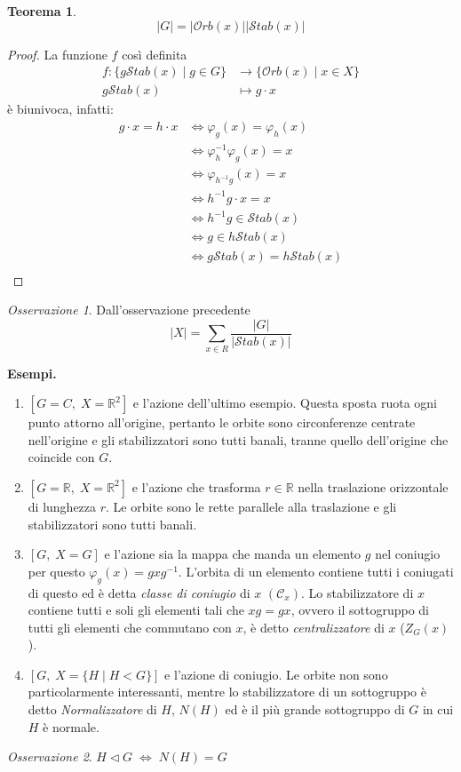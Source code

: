 \documentclass[a4paper]{article}
\newtheorem{theorem}{Teorema}[section]
\theoremstyle{remark}
\newtheorem*{remark}{Osservazione}
\theoremstyle{definition}
\newcommand{\Orb}[1]{\mathcal{O}rb\left( #1 \right)}
\newcommand{\Stab}[1]{\mathcal{S}tab\left( #1 \right)}
\begin{document}
\begin{multicols}{2}
\begin{theorem}
	\[ |G| = |\Orb{x}||\Stab{x}| \]
\end{theorem}
\begin{proof}
	La funzione $ f $ così definita
	\begin{align*}
	f \colon \{ g \Stab{x} \mid g \in G \} &\to \{\Orb{x} \mid x \in X\} \\
	g\Stab{x} &\mapsto g \cdot x
	\end{align*}
	è biunivoca, infatti:
	\begin{align*}
		g \cdot x = h \cdot x & \Leftrightarrow \varphi_g(x) = \varphi_h(x) \\
		& \Leftrightarrow \varphi_h^{-1} \varphi_g (x) = x \\
		& \Leftrightarrow \varphi_{h^{-1}g} (x) = x \\
		& \Leftrightarrow h^{-1}g \cdot x = x \\
		& \Leftrightarrow h^{-1}g \in \Stab{x} \\
		& \Leftrightarrow g \in h\Stab{x} \\
		& \Leftrightarrow g\Stab{x} = h\Stab{x} \\
	\end{align*}
\end{proof}
\begin{remark}
	Dall'osservazione precedente \[ |X| = \sum_{x \in R} \frac{|G|}{|\Stab{x}|} \]
\end{remark}

\textbf{Esempi.}
\begin{enumerate}
	\item $ [G = C,\; X = \mathbb{R}^2 ] $ e l'azione dell'ultimo esempio. Questa sposta ruota ogni punto attorno all'origine, pertanto le orbite sono circonferenze centrate nell'origine e gli stabilizzatori sono tutti banali, tranne quello dell'origine che coincide con $ G $.
	\item $ [G = \mathbb{R},\; X = \mathbb{R}^2 ] $ e l'azione che trasforma $ r \in \mathbb{R} $ nella traslazione orizzontale di lunghezza $ r $. Le orbite sono le rette parallele alla traslazione e gli stabilizzatori sono tutti banali.
	\item $ [G,\; X = G ] $ e l'azione sia la mappa che manda un elemento $ g $ nel coniugio per questo $ \varphi_g(x) = gxg^{-1} $. L'orbita di un elemento contiene tutti i coniugati di questo ed è detta \emph{classe di coniugio} di $ x $ $ (\mathcal{C}_x) $. Lo stabilizzatore di $ x $ contiene tutti e soli gli elementi tali che $ xg = gx $, ovvero il sottogruppo di tutti gli elementi che commutano con $ x $, è detto \emph{centralizzatore} di $ x $ ($ Z_G(x) $).
	\item $ [G,\; X = \{ H \mid H < G \} ] $ e l'azione di coniugio. Le orbite non sono particolarmente interessanti, mentre lo stabilizzatore di un sottogruppo è detto \emph{Normalizzatore} di $ H $, $ N(H) $ ed è il più grande sottogruppo di $ G $ in cui $ H $ è normale.
\end{enumerate}
\begin{remark}
	$ H \lhd G \;\Leftrightarrow\; N(H) = G $
\end{remark}
\end{multicols}
\end{document}
